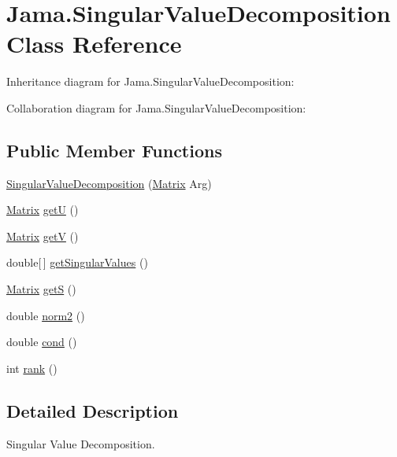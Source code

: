 \hypertarget{class_jama_1_1_singular_value_decomposition}{\section{Jama.\+Singular\+Value\+Decomposition Class Reference}
\label{class_jama_1_1_singular_value_decomposition}
}


Inheritance diagram for Jama.\+Singular\+Value\+Decomposition\+:


Collaboration diagram for Jama.\+Singular\+Value\+Decomposition\+:
\subsection*{Public Member Functions}
\begin{DoxyCompactItemize}
\item 
\hyperlink{class_jama_1_1_singular_value_decomposition_a3f28de078519f131ef50e32e9f489708}{Singular\+Value\+Decomposition} (\hyperlink{class_jama_1_1_matrix}{Matrix} Arg)
\item 
\hyperlink{class_jama_1_1_matrix}{Matrix} \hyperlink{class_jama_1_1_singular_value_decomposition_aa5f3a3541dc98ad8b9abb4b3ba07f0fc}{get\+U} ()
\item 
\hyperlink{class_jama_1_1_matrix}{Matrix} \hyperlink{class_jama_1_1_singular_value_decomposition_ad0e8cf5267ef9a61fa97324fc8649d8e}{get\+V} ()
\item 
double\mbox{[}$\,$\mbox{]} \hyperlink{class_jama_1_1_singular_value_decomposition_a787358e07849a230154d02ed5009a9a1}{get\+Singular\+Values} ()
\item 
\hyperlink{class_jama_1_1_matrix}{Matrix} \hyperlink{class_jama_1_1_singular_value_decomposition_a9806f3bbaf6404473ef1f19f58779cff}{get\+S} ()
\item 
double \hyperlink{class_jama_1_1_singular_value_decomposition_ad9cb6dcaefb3630b45512d48b0881db2}{norm2} ()
\item 
double \hyperlink{class_jama_1_1_singular_value_decomposition_a0193ef1cb3aa0361d897409a53a6e4c6}{cond} ()
\item 
int \hyperlink{class_jama_1_1_singular_value_decomposition_ae6d09f8cfe7ae5bb521d6f43405cb8ba}{rank} ()
\end{DoxyCompactItemize}


\subsection{Detailed Description}
Singular Value Decomposition. 

